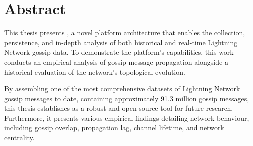 \section*{Abstract}

This thesis presents , a novel platform architecture that enables the collection, 
persistence, and in-depth analysis of both historical and real-time Lightning Network gossip data. 
To demonstrate the platform's capabilities, this work conducts an empirical analysis of 
gossip message propagation alongside a historical evaluation of the network's topological evolution.

By assembling one of the most comprehensive datasets of Lightning Network gossip messages to date,
containing approximately \num{91.3} million gossip messages, 
this thesis establishes  as a robust and open-source tool for future research. 
Furthermore, it presents various empirical findings detailing network behaviour, 
including gossip overlap, propagation lag, channel lifetime, and network centrality.